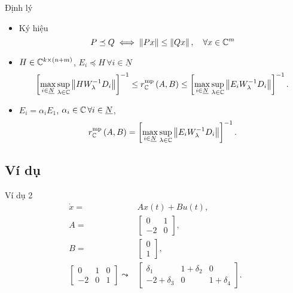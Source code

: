 
\begin{frame}{Định lý}
    \begin{itemize}
        \item Ký hiệu
        \begin{equation}
            P\preceq Q\iff\left\lVert Px\right\rVert\le\left\lVert Qx\right\rVert,\quad\forall x\in\mathbb{C}^{m}
        \end{equation}
        \item \(H\in\mathbb{C}^{k\times\left(n+m\right)}\), $E_{i}\preceq H\, \forall i\in\underline{N}$
        \begin{equation}
            \left[\max_{i\in\underline{N}}\sup_{\lambda\in \mathbb{C}}\left\lVert HW_{\lambda}^{-1}D_{i}\right\rVert\right]^{-1}\le r_{\mathbb{C}}^{\text{mp}}\left(A,B\right)\le\left[\max_{i\in\underline{N}}\sup_{\lambda\in \mathbb{C}}\left\lVert E_{i}W_{\lambda}^{-1}D_{i}\right\rVert\right]^{-1}.
        \end{equation}
        \item $E_{i}=\alpha_{i}E_{1}$, $\alpha_{i}\in\mathbb{C} \,\forall i\in\underline{N}$,
        \begin{equation}
            r_{\mathbb{C}}^{\text{mp}}\left(A,B\right)=\left[\max_{i\in\underline{N}}\sup_{\lambda\in \mathbb{C}}\left\lVert E_{i}W_{\lambda}^{-1}D_{i}\right\rVert\right]^{-1}.
        \end{equation}
    \end{itemize}
\end{frame}


\subsection{Ví dụ}
\begin{frame}{Ví dụ 2}
    \begin{align}
        \dot{x}= & Ax\left(t\right)+Bu\left(t\right),\\
        A= & \left[\begin{array}{cc}
        0 & 1\\
        -2 & 0
        \end{array}\right],\\
        B= & \left[\begin{array}{c}
        0\\
        1
        \end{array}\right],\\
        \left[\begin{array}{ccc}
        0 & 1 & 0\\
        -2 & 0 & 1
        \end{array}\right]\leadsto & \left[\begin{array}{ccc}
        \delta_{1} & 1+\delta_{2} & 0\\
        -2+\delta_{3} & 0 & 1+\delta_{4}
        \end{array}\right].
    \end{align}
\end{frame}

